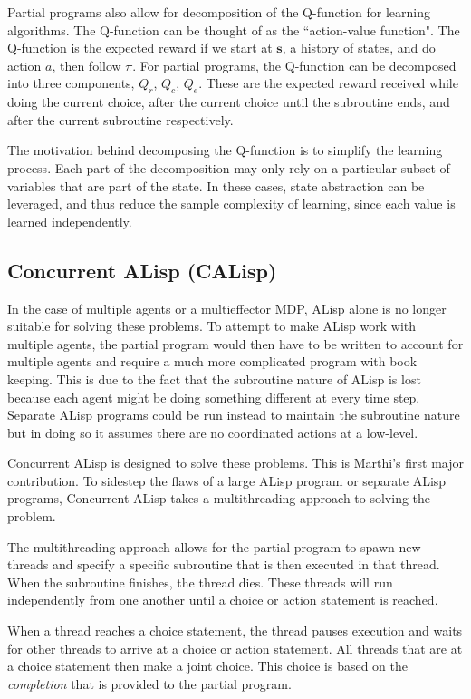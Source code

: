 \documentclass[jair,twoside,11pt,theapa]{article}
\begin{document}
Partial programs also allow for decomposition of the Q-function for learning algorithms. The Q-function can be thought of as the ``action-value function". The Q-function is the expected reward if we start at $\textbf{s}$, a history of states, and do action $a$, then follow $\pi$. For partial programs, the Q-function can be decomposed into three components, $Q_r$, $Q_c$, $Q_e$. These are the expected reward received while doing the current choice, after the current choice until the subroutine ends, and after the current subroutine respectively.  

The motivation behind decomposing the Q-function is to simplify the learning process. Each part of the decomposition may only rely on a particular subset of variables that are part of the state. In these cases, state abstraction can be leveraged, and thus reduce the sample complexity of learning, since each value is learned independently. 


\subsection{Concurrent ALisp (CALisp)}
\label{CALisp}
In the case of multiple agents or a multieffector MDP, ALisp alone is no longer suitable for solving these problems. To attempt to make ALisp work with multiple agents, the partial program would then have to be written to account for multiple agents and require a much more complicated program with book keeping. This is due to the fact that the subroutine nature of ALisp is lost because each agent might be doing something different at every time step. Separate ALisp programs could be run instead to maintain the subroutine nature but in doing so it assumes there are no coordinated actions at a low-level. 

Concurrent ALisp is designed to solve these problems. This is Marthi's first major contribution. To sidestep the flaws of a large ALisp program or separate ALisp programs, Concurrent ALisp takes a multithreading approach to solving the problem.

The multithreading approach allows for the partial program to spawn new threads and specify a specific subroutine that is then executed in that thread. When the subroutine finishes, the thread dies. These threads will run independently from one another until a choice or action statement is reached. 

When a thread reaches a choice statement, the thread pauses execution and waits for other threads to arrive at a choice or action statement. All threads that are at a choice statement then make a joint choice. This choice is based on the \textit{completion} that is provided to the partial program. 
\end{document}
